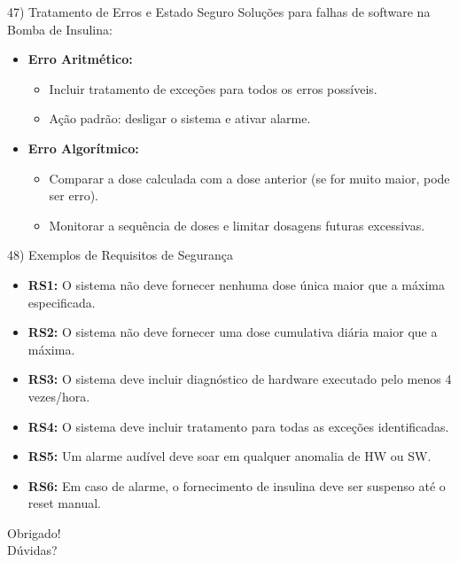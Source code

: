 \documentclass[aspectratio=169]{beamer}
\begin{document}
\begin{frame}{47) Tratamento de Erros e Estado Seguro}
  Soluções para falhas de software na Bomba de Insulina:
  \vspace{0.5em}
  \begin{itemize}
    \item \textbf{Erro Aritmético:}
    \begin{itemize}
      \item Incluir tratamento de exceções para todos os erros possíveis.
      \item Ação padrão: \alert{desligar o sistema} e ativar alarme.
    \end{itemize}
    \item \textbf{Erro Algorítmico:}
    \begin{itemize}
      \item Comparar a dose calculada com a dose anterior (se for muito maior, pode ser erro).
      \item Monitorar a sequência de doses e limitar dosagens futuras excessivas.
    \end{itemize}
  \end{itemize}
\end{frame}

\begin{frame}{48) Exemplos de Requisitos de Segurança}
  \small
  \begin{itemize}
    \item \textbf{RS1:} O sistema não deve fornecer nenhuma dose única maior que a máxima especificada.
    \item \textbf{RS2:} O sistema não deve fornecer uma dose cumulativa diária maior que a máxima.
    \item \textbf{RS3:} O sistema deve incluir diagnóstico de hardware executado pelo menos 4 vezes/hora.
    \item \textbf{RS4:} O sistema deve incluir tratamento para todas as exceções identificadas.
    \item \textbf{RS5:} Um alarme audível deve soar em qualquer anomalia de HW ou SW.
    \item \textbf{RS6:} Em caso de alarme, o fornecimento de insulina deve ser suspenso até o reset manual.
  \end{itemize}
\end{frame}

\begin{frame}
  \centering
  \Huge Obrigado!\\
  \vspace{1cm}
  \large Dúvidas?
\end{frame}

\end{document}
